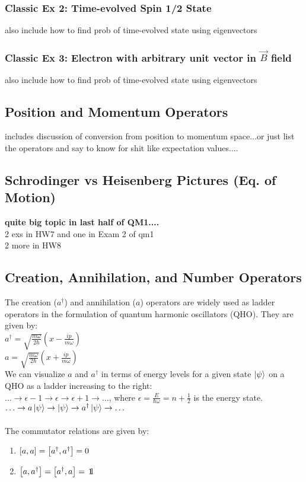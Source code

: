 \documentclass[]{article}
\newcommand{\oneQM}{$1\hspace{-0.21em}\text l$}
\begin{document}
\subsubsection{Classic Ex 2: Time-evolved Spin 1/2 State}
also include how to find prob of time-evolved state using eigenvectors
\subsubsection{Classic Ex 3: Electron with arbitrary unit vector in $\vec{B}$ field}
also include how to find prob of time-evolved state using eigenvectors

\subsection{Position and Momentum Operators}
includes discussion of conversion from position to momentum space...or just list the operators and say to know for shit like expectation values....

\subsection{Schrodinger vs Heisenberg Pictures (Eq. of Motion)}
\textbf{quite big topic in last half of QM1....} \\
2 exs in HW7 and one in Exam 2 of qm1 \\
2 more in HW8

\subsection{Creation, Annihilation, and Number Operators}
The creation ($a^{\dagger}$) and annihilation ($a$) operators are widely used as ladder operators in the formulation of quantum harmonic oscillators (QHO). They are given by:\\
$a^{\dagger} = \sqrt{\frac{m\omega}{2\hbar}}(x-\frac{ip}{m\omega})$\\
$a = \sqrt{\frac{m\omega}{2\hbar}}(x+\frac{ip}{m\omega})$\\
We can visualize $a$ and $a^\dagger$ in terms of energy levels for a given state $\ket{\psi}$ on a QHO as a ladder increasing to the right:\\
$\ldots \rightarrow \epsilon-1 \rightarrow \epsilon \rightarrow \epsilon+1 \rightarrow \ldots$, where $\epsilon = \frac{E}{\hbar \omega} = n + \frac{1}{2}$ is the energy state.\\
$\ldots \rightarrow a\ket{\psi} \rightarrow \ket{\psi} \rightarrow a^{\dagger}\ket{\psi} \rightarrow \ldots$\\ \\
The commutator relations are given by:
\begin{enumerate}
    \item $\comm{a}{a} = \comm{a^{\dagger}}{a^{\dagger}} = 0$
    \item $\comm{a}{a^{\dagger}} = \comm{a^{\dagger}}{a} = $ \oneQM
\end{enumerate}
\end{document}
